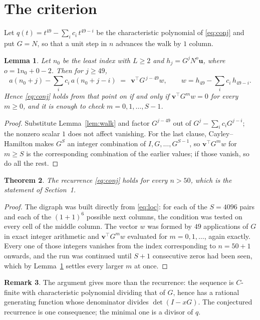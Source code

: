 \documentclass[11pt,a4paper]{article}
\theoremstyle{plain}
\newtheorem{theorem}{Theorem}
\newtheorem{lemma}[theorem]{Lemma}
\theoremstyle{definition}
\newtheorem{remark}[theorem]{Remark}
\begin{document}
\section{The criterion}

Let $q(t)=t^{49}-\sum_i c_i\,t^{49-i}$ be the characteristic polynomial of
\eqref{eq:conj} and put $G=N$, so that a unit step in $n$ advances the walk by
$1$ column.

\begin{lemma}\label{lem:crit}
Let $n_0$ be the least index with $L\ge2$ and $h_j=G^{j}N^{o}\mathbf{u}$, where
$o=1n_0+0-2$. Then for $j\ge49$,
\[
a(n_0+j)-\sum_i c_i\,a(n_0+j-i)\;=\;\,\mathbf{v}^{\!\top}G^{\,j-49}w,
\qquad w=h_{49}-\sum_i c_i\,h_{49-i} .
\]
Hence \eqref{eq:conj} holds from that point on if and only if
$\mathbf{v}^{\!\top}G^{m}w=0$ for every $m\ge0$, and it is enough to check
$m=0,1,\dots,S-1$.
\end{lemma}

\begin{proof}
Substitute Lemma~\ref{lem:walk} and factor $G^{j-49}$ out of
$G^{j}-\sum_ic_iG^{j-i}$; the nonzero scalar $1$ does not affect
vanishing. For the last clause, Cayley--Hamilton makes $G^{S}$ an integer combination of
$I,G,\dots,G^{S-1}$, so $\mathbf{v}^{\!\top}G^{m}w$ for $m\ge S$ is the corresponding
combination of the earlier values; if those vanish, so do all the rest.
\end{proof}

\begin{theorem}
The recurrence \eqref{eq:conj} holds for every $n>50$, which is the statement of
Section~1.
\end{theorem}

\begin{proof}
The digraph was built directly from \eqref{eq:loc}: for each of the $S=4096$ pairs and each
of the $(1+1)^{6}$ possible next columns, the condition was tested on every cell of
the middle column. The vector $w$ was formed by $49$ applications of $G$ in exact integer
arithmetic and $\mathbf{v}^{\!\top}G^{m}w$ evaluated for $m=0,1,\dots$, again exactly.
Every one of those integers vanishes from the index corresponding to $n=50+1$ onwards,
and the run was continued until $S+1$ consecutive zeros had been seen, which by
Lemma~\ref{lem:crit} settles every larger $m$ at once.
\end{proof}

\begin{remark}
The argument gives more than the recurrence: the sequence is $C$-finite with characteristic
polynomial dividing that of $G$, hence has a rational generating function whose denominator
divides $\det(I-xG)$. The conjectured recurrence is one consequence; the minimal one is a
divisor of $q$.
\end{remark}
\end{document}
